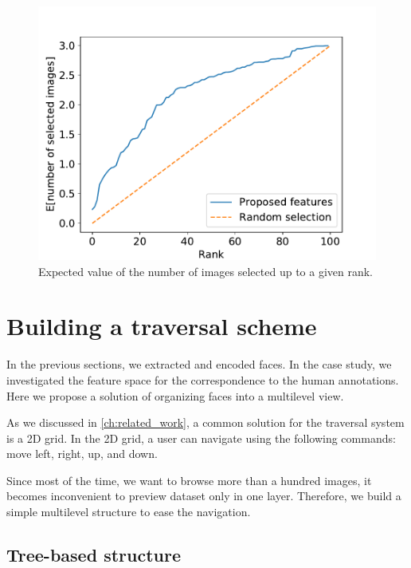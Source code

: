 \begin{figure}
    \centering
    \includegraphics[width=0.8\linewidth]{graphs/survey_cumsum_without_the_easy.pdf}
    \caption{Expected value of the number of images selected up to a given rank.}
    \label{fig:cumsum_faces}
\end{figure}

\section{Building a traversal scheme}

In the previous sections, we extracted and encoded faces. In the case study, we investigated the feature space for the correspondence to the human annotations. Here we propose a solution of organizing faces into a multilevel view. 

As we discussed in \autoref{ch:related_work}, a common solution for the traversal system is a 2D grid.  In the 2D grid, a user can navigate using the following commands: move left, right, up, and down.



Since most of the time, we want to browse more than a hundred images, it becomes inconvenient to preview dataset only in one layer. Therefore, we build a simple multilevel structure to ease the navigation.

\subsection{Tree-based structure}

